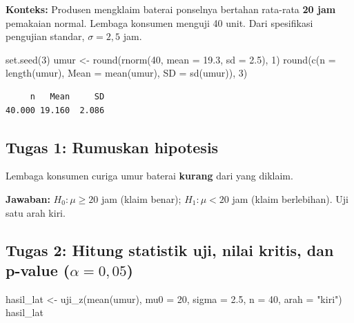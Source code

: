 \documentclass[
  indonesian,
  letterpaper,
]{book}
\newenvironment{Shaded}{\begin{snugshade}}{\end{snugshade}}
\newcommand{\AttributeTok}[1]{\textcolor[rgb]{0.40,0.45,0.13}{#1}}
\newcommand{\DecValTok}[1]{\textcolor[rgb]{0.68,0.00,0.00}{#1}}
\newcommand{\FloatTok}[1]{\textcolor[rgb]{0.68,0.00,0.00}{#1}}
\newcommand{\FunctionTok}[1]{\textcolor[rgb]{0.28,0.35,0.67}{#1}}
\newcommand{\NormalTok}[1]{\textcolor[rgb]{0.00,0.23,0.31}{#1}}
\newcommand{\OtherTok}[1]{\textcolor[rgb]{0.00,0.23,0.31}{#1}}
\newcommand{\StringTok}[1]{\textcolor[rgb]{0.13,0.47,0.30}{#1}}
\begin{document}
\textbf{Konteks:} Produsen mengklaim baterai ponselnya bertahan
rata-rata \textbf{20 jam} pemakaian normal. Lembaga konsumen menguji 40
unit. Dari spesifikasi pengujian standar, \(\sigma = 2{,}5\) jam.

\begin{Shaded}
\begin{Highlighting}[]
\FunctionTok{set.seed}\NormalTok{(}\DecValTok{3}\NormalTok{)}
\NormalTok{umur }\OtherTok{\textless{}{-}} \FunctionTok{round}\NormalTok{(}\FunctionTok{rnorm}\NormalTok{(}\DecValTok{40}\NormalTok{, }\AttributeTok{mean =} \FloatTok{19.3}\NormalTok{, }\AttributeTok{sd =} \FloatTok{2.5}\NormalTok{), }\DecValTok{1}\NormalTok{)}
\FunctionTok{round}\NormalTok{(}\FunctionTok{c}\NormalTok{(}\AttributeTok{n =} \FunctionTok{length}\NormalTok{(umur), }\AttributeTok{Mean =} \FunctionTok{mean}\NormalTok{(umur), }\AttributeTok{SD =} \FunctionTok{sd}\NormalTok{(umur)), }\DecValTok{3}\NormalTok{)}
\end{Highlighting}
\end{Shaded}

\begin{verbatim}
     n   Mean     SD 
40.000 19.160  2.086 
\end{verbatim}

\subsection{Tugas 1: Rumuskan
hipotesis}\label{tugas-1-rumuskan-hipotesis}

Lembaga konsumen curiga umur baterai \textbf{kurang} dari yang diklaim.

\textbf{Jawaban:} \(H_0: \mu \geq 20\) jam (klaim benar);
\(H_1: \mu < 20\) jam (klaim berlebihan). Uji satu arah kiri.

\subsection{\texorpdfstring{Tugas 2: Hitung statistik uji, nilai kritis,
dan p-value
(\(\alpha = 0{,}05\))}{Tugas 2: Hitung statistik uji, nilai kritis, dan p-value (\textbackslash alpha = 0\{,\}05)}}\label{tugas-2-hitung-statistik-uji-nilai-kritis-dan-p-value-alpha-005}

\begin{Shaded}
\begin{Highlighting}[]
\NormalTok{hasil\_lat }\OtherTok{\textless{}{-}} \FunctionTok{uji\_z}\NormalTok{(}\FunctionTok{mean}\NormalTok{(umur), }\AttributeTok{mu0 =} \DecValTok{20}\NormalTok{, }\AttributeTok{sigma =} \FloatTok{2.5}\NormalTok{, }\AttributeTok{n =} \DecValTok{40}\NormalTok{, }\AttributeTok{arah =} \StringTok{"kiri"}\NormalTok{)}
\NormalTok{hasil\_lat}
\end{Highlighting}
\end{Shaded}
\end{document}
